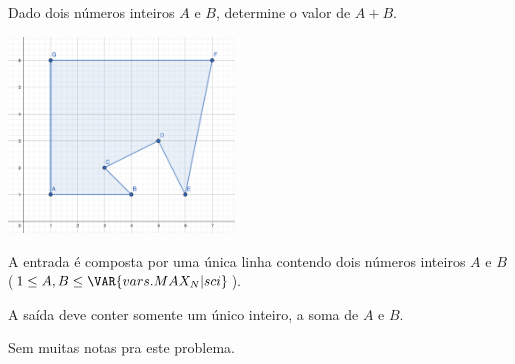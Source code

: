 Dado dois números inteiros $A$ e $B$, determine o valor de $A + B$.

\includegraphics[width=6cm]{projecao.png}

A entrada é composta por uma única linha contendo dois números
inteiros $A$ e $B$ ($1 \leq A, B \leq \VAR{vars.MAX_N | sci}$).

A saída deve conter somente um único inteiro, a soma de $A$ e $B$.

Sem muitas notas pra este problema.
